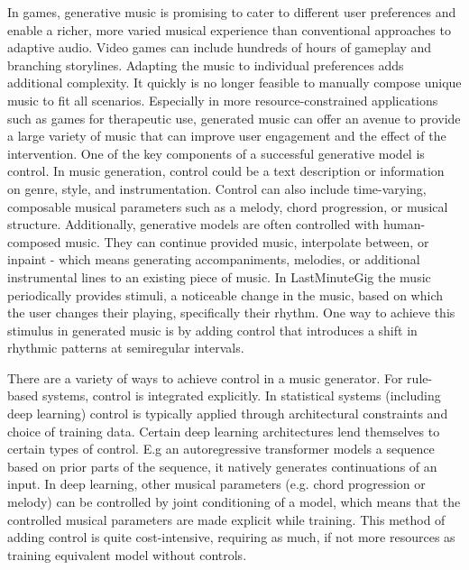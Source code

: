 In games, generative music is promising to cater to different user preferences and enable a richer, more varied musical experience than conventional approaches to adaptive audio. Video games can include hundreds of hours of gameplay and branching storylines. Adapting the music to individual preferences adds additional complexity. It quickly is no longer feasible to manually compose unique music to fit all scenarios. Especially in more resource-constrained applications such as games for therapeutic use, generated music can offer an avenue to provide a large variety of music that can improve user engagement and the effect of the intervention.
One of the key components of a successful generative model is control. In music generation, control could be a text description or information on genre, style, and instrumentation. Control can also include time-varying, composable musical parameters such as a melody, chord progression, or musical structure. Additionally, generative models are often controlled with human-composed music. They can continue provided music, interpolate between, or inpaint - which means generating accompaniments, melodies, or additional instrumental lines to an existing piece of music. In LastMinuteGig \cite{Chalkiadakis_2022} the music periodically provides stimuli, a noticeable change in the music, based on which the user changes their playing, specifically their rhythm. One way to achieve this stimulus in generated music is by adding control that introduces a shift in rhythmic patterns at semiregular intervals. 

There are a variety of ways to achieve control in a music generator. For rule-based systems, control is integrated explicitly. In statistical systems (including deep learning) control is typically applied through architectural constraints and choice of training data. Certain deep learning architectures lend themselves to certain types of control. E.g an autoregressive transformer models a sequence based on prior parts of the sequence, it natively generates continuations of an input. In deep learning, other musical parameters (e.g. chord progression or melody) can be controlled by joint conditioning of a model, which means that the controlled musical parameters are made explicit while training. This method of adding control is quite cost-intensive, requiring as much, if not more resources as training equivalent model without controls. 

